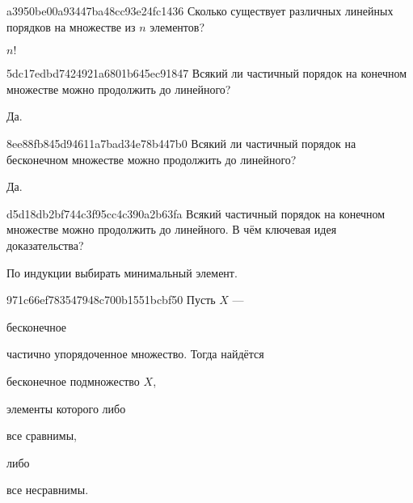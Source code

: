 \begin{note}{a3950be00a93447ba48cc93e24fc1436}
    Сколько существует различных линейных порядков на множестве из \({ n }\) элементов?

    \begin{cloze}{1}
        \({ n! }\)
    \end{cloze}
\end{note}

\begin{note}{5dc17edbd7424921a6801b645ec91847}
    Всякий ли частичный порядок на конечном множестве можно продолжить до линейного?

    \begin{cloze}{1}
        Да.
    \end{cloze}
\end{note}

\begin{note}{8ee88fb845d94611a7bad34e78b447b0}
    Всякий ли частичный порядок на бесконечном множестве можно продолжить до линейного?

    \begin{cloze}{1}
        Да.
    \end{cloze}
\end{note}

\begin{note}{d5d18db2bf744c3f95cc4c390a2b63fa}
    Всякий частичный порядок на конечном множестве можно продолжить до линейного.
    В чём ключевая идея доказательства?

    \begin{cloze}{1}
        По индукции выбирать минимальный элемент.
    \end{cloze}
\end{note}

\begin{note}{971c66ef783547948c700b1551bcbf50}
    Пусть \({ X }\) --- \begin{icloze}{3}бесконечное\end{icloze} частично упорядоченное множество.
    Тогда найдётся \begin{icloze}{2}бесконечное подмножество \({ X }\),\end{icloze} элементы которого либо \begin{icloze}{1}все сравнимы,\end{icloze} либо \begin{icloze}{1}все несравнимы.\end{icloze}
\end{note}

